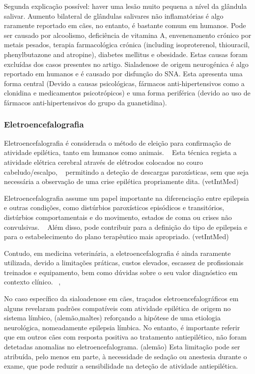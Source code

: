 Segunda explicação possível: haver uma lesão muito pequena a nível da glândula salivar. Aumento bilateral de glândulas salivares não inflamatórias é algo raramente reportado em cães, no entanto, é bastante comum em humanos. Pode ser causado por alcoolismo, deficiência de vitamina A, envenenamento crónico por metais pesados, terapia farmacológica crónica (including isoproterenol, thiouracil, phenylbutazone and atropine), diabetes mellitus e obesidade. Estas causas foram excluídas dos casos presentes no artigo. Sialadenose de origem neurogénica é algo reportado em humanos e é causado por disfunção do SNA. Esta apresenta uma forma central (Devido a causas psicológicas, fármacos anti-hipertensivos como a clonidina e medicamentos psicotrópicos) e uma forma periférica (devido ao uso de fármacos anti-hipertensivos do grupo da guanetidina).

\subsubsection{Eletroencefalografia}


Eletroencefalografia é considerada o método de eleição para confirmação de atividade epilética, tanto em humanos como animais. ~\cite{Everest2024} Esta técnica regista a atividade elétrica cerebral através de elétrodos colocados no couro cabeludo/escalpo, ~\cite{Everest2024} permitindo a deteção de descargas paroxísticas, sem que seja necessária a observação de uma crise epilética propriamente dita. (vetIntMed)


Eletroencefalografia assume um papel importante na diferenciação entre epilepsia e outras condições, como distúrbios paroxísticos episódicos e transitórios, distúrbios comportamentais e do movimento, estados de coma ou crises não convulsivas. ~\cite{Luca2023} Além disso, pode contribuir para a definição do tipo de epilepsia e para o estabelecimento do plano terapêutico mais apropriado. (vetIntMed)


Contudo, em medicina veterinária, a eletroencefalografia é ainda raramente utilizada, devido a limitações práticas, custos elevados, escassez de profissionais treinados e equipamento, bem como dúvidas sobre o seu valor diagnóstico em contexto clínico. ~\cite{Everest2024},~\cite{Luca2023}


No caso específico da sialoadenose em cães, traçados eletroencefalográficos em alguns revelaram padrões compatíveis com atividade epilética de origem no sistema límbico, (alemão,maltes) reforçando a hipótese de uma etiologia neurológica, nomeadamente epilepsia límbica. No entanto, é importante referir que em outros cães com resposta positiva ao tratamento antiepilético, não foram detetadas anomalias no eletroencefalograma. (alemão) Esta limitação pode ser atribuída, pelo menos em parte, à necessidade de sedação ou anestesia durante o exame, que pode reduzir a sensibilidade na deteção de atividade antiepilética. ~\cite{Loscher2022}

